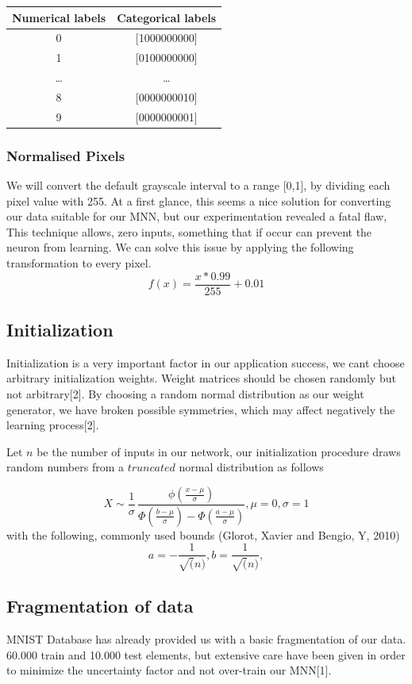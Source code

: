 \documentclass{proc}
\begin{document}
	\begin{center}
		\begin{tabular}{ |c|c| } 
			\hline
			Numerical labels & Categorical labels \\
			\hline
			 0 & [1000000000] \\ 
			 1 & [0100000000] \\ 
			 \dots & \dots \\
			 8 & [0000000010] \\ 
			 9 & [0000000001] \\ 
			\hline
		\end{tabular}
	\end{center}
	\subsubsection{Normalised Pixels}
	We will convert the default grayscale interval to a range [0,1], by dividing each pixel value with 255. At a first glance, this seems a nice solution for converting our data suitable for our MNN, but our experimentation revealed a fatal flaw, This technique allows, zero inputs, something that if occur can prevent the neuron from learning. We can solve this issue by applying the following transformation to every pixel.
	\[
		f(x)=\frac{x*0.99}{255}+0.01
	\]
	\subsection{Initialization}
	Initialization is a very important factor in our application success, we cant choose arbitrary initialization weights. Weight matrices should be chosen randomly but not arbitrary[2]. By choosing a random normal distribution as our weight generator, we have broken possible symmetries, which may affect negatively the learning process[2].
	
	Let ${n}$ be the number of inputs in our network, our initialization procedure draws random numbers from a $truncated$ normal distribution as follows
	
	\[
		{\displaystyle X\sim{\frac {1}{\sigma }}\,{\frac {\phi ({\frac {x-\mu }{\sigma }})}{\Phi ({\frac {b-\mu }{\sigma }})-\Phi ({\frac {a-\mu }{\sigma }})}}},
		\mu=0,
		\sigma=1
	\]
	with the following, commonly used bounds (Glorot, Xavier and Bengio, Y, 2010)
	\[	a=-\frac{1}{\sqrt(n)},
		b=\frac{1}{\sqrt(n)},
	\] 
	\subsection{Fragmentation of data}
	MNIST Database has already provided us with a basic fragmentation of our data. 60.000 train and 10.000 test elements, but extensive care have been given in order to minimize the uncertainty factor and not over-train our MNN[1].
	
\end{document}
